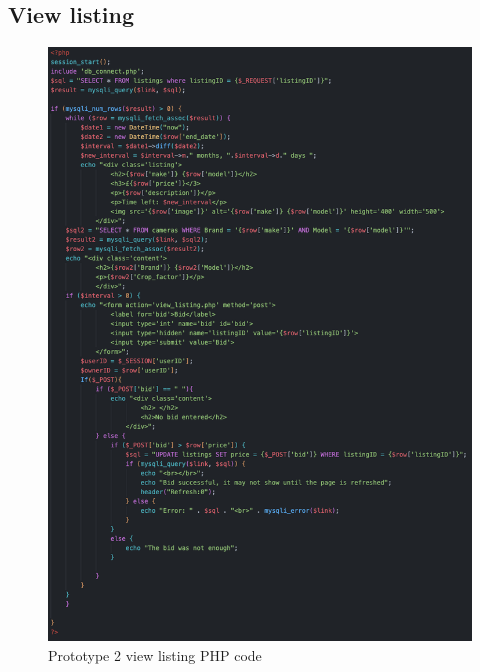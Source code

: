 \subsection{View listing}
\begin{figure}[H]
    \centering
    \includegraphics[scale=0.4]{ch3_developing/proto2/proto2_viewlisting.png}
    \caption{Prototype 2 view listing PHP code}
    \label{fig:proto2_viewlisting}
\end{figure}
